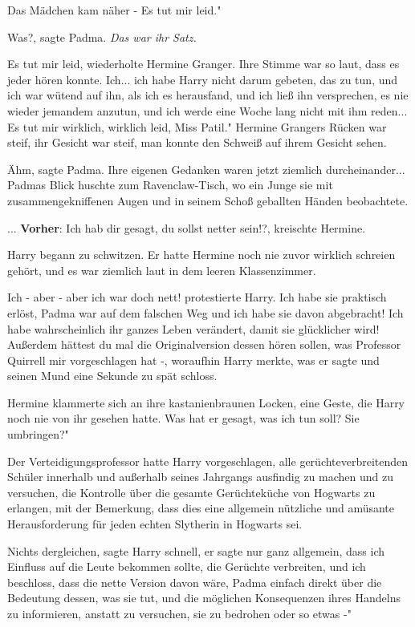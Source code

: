 Das Mädchen kam näher - \glqq{}Es tut mir leid."

\glqq{}Was?\grqq{}, sagte Padma. \emph{Das war ihr Satz.}

\glqq{}Es tut mir leid\grqq{}, wiederholte Hermine Granger. Ihre Stimme war so
laut, dass es jeder hören konnte. \glqq{}Ich... ich habe Harry nicht darum
gebeten, das zu tun, und ich war wütend auf ihn, als ich es herausfand, und ich
ließ ihn versprechen, es nie wieder jemandem anzutun, und ich werde eine Woche
lang nicht mit ihm reden... Es tut mir wirklich, wirklich leid, Miss Patil."
Hermine Grangers Rücken war steif, ihr Gesicht war steif, man konnte den Schweiß
auf ihrem Gesicht sehen.

\glqq{}Ähm\grqq{}, sagte Padma. Ihre eigenen Gedanken waren jetzt ziemlich
durcheinander... Padmas Blick huschte zum Ravenclaw-Tisch, wo ein Junge sie mit
zusammengekniffenen Augen und in seinem Schoß geballten Händen beobachtete.

... \textbf{Vorher}: \glqq{}Ich hab dir gesagt, du sollst netter sein!?\grqq{},
kreischte Hermine.

Harry begann zu schwitzen. Er hatte Hermine noch nie zuvor wirklich schreien
gehört, und es war ziemlich laut in dem leeren Klassenzimmer.

\glqq{}Ich - aber - aber ich war doch nett!\grqq{} protestierte Harry. \glqq{}Ich
habe sie praktisch erlöst, Padma war auf dem falschen Weg und ich habe sie davon
abgebracht! Ich habe wahrscheinlich ihr ganzes Leben verändert, damit sie
glücklicher wird! Außerdem hättest du mal die Originalversion dessen hören
sollen, was Professor Quirrell mir vorgeschlagen hat -\grqq{}, woraufhin Harry
merkte, was er sagte und seinen Mund eine Sekunde zu spät schloss.

Hermine klammerte sich an ihre kastanienbraunen Locken, eine Geste, die Harry
noch nie von ihr gesehen hatte. \glqq{}Was hat er gesagt, was ich tun soll? Sie
umbringen?"

Der Verteidigungsprofessor hatte Harry vorgeschlagen, alle gerüchteverbreitenden
Schüler innerhalb und außerhalb seines Jahrgangs ausfindig zu machen und zu
versuchen, die Kontrolle über die gesamte Gerüchteküche von Hogwarts zu
erlangen, mit der Bemerkung, dass dies eine allgemein nützliche und amüsante
Herausforderung für jeden echten Slytherin in Hogwarts sei.

\glqq{}Nichts dergleichen\grqq{}, sagte Harry schnell, \glqq{}er sagte nur ganz
allgemein, dass ich Einfluss auf die Leute bekommen sollte, die Gerüchte
verbreiten, und ich beschloss, dass die nette Version davon wäre, Padma einfach
direkt über die Bedeutung dessen, was sie tut, und die möglichen Konsequenzen
ihres Handelns zu informieren, anstatt zu versuchen, sie zu bedrohen oder so
etwas -"

